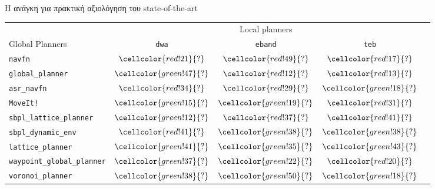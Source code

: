 \begin{frame}{Η ανάγκη για πρακτική αξιολόγηση του state-of-the-art}
{\footnotesize
\begin{table}[h]
\begin{tabular}{lcccc}
  & \multicolumn{3}{c}{Local planners} \\
  \cline{2-4}
  Global Planners                     & \texttt{dwa}                               & \texttt{eband}                             & \texttt{teb} \\ \toprule
  \texttt{navfn}                     & $\cellcolor{red!21}{?}$         & $\cellcolor{red!49}{?}$            & $\cellcolor{red!17}{?}$         \\
  \texttt{global\_planner}           & $\cellcolor{green!47}{?}$         & $\cellcolor{red!12}{?}$            & $\cellcolor{red!13}{?}$         \\
  \texttt{asr\_navfn}                & $\cellcolor{red!34}{?}$         & $\cellcolor{red!29}{?}$            & $\cellcolor{green!18}{?}$         \\
  \texttt{MoveIt!}                   & $\cellcolor{green!15}{?}$         & $\cellcolor{green!19}{?}$            & $\cellcolor{red!31}{?}$         \\
  \texttt{sbpl\_lattice\_planner}    & $\cellcolor{green!12}{?}$         & $\cellcolor{red!37}{?}$            & $\cellcolor{red!41}{?}$         \\
  \texttt{sbpl\_dynamic\_env}        & $\cellcolor{red!41}{?}$         & $\cellcolor{green!38}{?}$            & $\cellcolor{green!38}{?}$         \\
  \texttt{lattice\_planner}          & $\cellcolor{green!41}{?}$         & $\cellcolor{green!35}{?}$            & $\cellcolor{green!43}{?}$         \\
  \texttt{waypoint\_global\_planner} & $\cellcolor{green!37}{?}$         & $\cellcolor{green!22}{?}$            & $\cellcolor{red!20}{?}$         \\
  \texttt{voronoi\_planner}          & $\cellcolor{green!38}{?}$         & $\cellcolor{green!50}{?}$            & $\cellcolor{green!18}{?}$         \\ \bottomrule
\end{tabular}
\end{table}
}

\end{frame}


